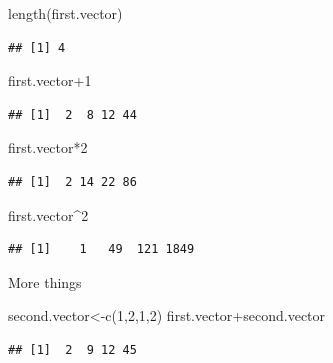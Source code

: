 \documentclass[
]{gitbook}
\newenvironment{Shaded}{\begin{snugshade}}{\end{snugshade}}
\newcommand{\DecValTok}[1]{\textcolor[rgb]{0.00,0.00,0.81}{#1}}
\newcommand{\FunctionTok}[1]{\textcolor[rgb]{0.00,0.00,0.00}{#1}}
\newcommand{\NormalTok}[1]{#1}
\newcommand{\OtherTok}[1]{\textcolor[rgb]{0.56,0.35,0.01}{#1}}
\newcommand{\SpecialCharTok}[1]{\textcolor[rgb]{0.00,0.00,0.00}{#1}}
\begin{document}
\begin{Shaded}
\begin{Highlighting}[]
\FunctionTok{length}\NormalTok{(first.vector)}
\end{Highlighting}
\end{Shaded}

\begin{verbatim}
## [1] 4
\end{verbatim}

\begin{Shaded}
\begin{Highlighting}[]
\NormalTok{first.vector}\SpecialCharTok{+}\DecValTok{1}
\end{Highlighting}
\end{Shaded}

\begin{verbatim}
## [1]  2  8 12 44
\end{verbatim}

\begin{Shaded}
\begin{Highlighting}[]
\NormalTok{first.vector}\SpecialCharTok{*}\DecValTok{2}
\end{Highlighting}
\end{Shaded}

\begin{verbatim}
## [1]  2 14 22 86
\end{verbatim}

\begin{Shaded}
\begin{Highlighting}[]
\NormalTok{first.vector}\SpecialCharTok{\^{}}\DecValTok{2}
\end{Highlighting}
\end{Shaded}

\begin{verbatim}
## [1]    1   49  121 1849
\end{verbatim}

More things

\begin{Shaded}
\begin{Highlighting}[]
\NormalTok{second.vector}\OtherTok{\textless{}{-}}\FunctionTok{c}\NormalTok{(}\DecValTok{1}\NormalTok{,}\DecValTok{2}\NormalTok{,}\DecValTok{1}\NormalTok{,}\DecValTok{2}\NormalTok{)}
\NormalTok{first.vector}\SpecialCharTok{+}\NormalTok{second.vector}
\end{Highlighting}
\end{Shaded}

\begin{verbatim}
## [1]  2  9 12 45
\end{verbatim}
\end{document}
